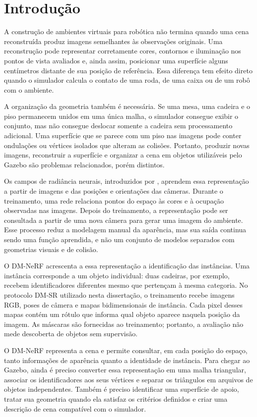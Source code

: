 \chapter{Introdução}

A construção de ambientes virtuais para robótica não termina quando uma cena reconstruída produz imagens semelhantes às observações originais. Uma reconstrução pode representar corretamente cores, contornos e iluminação nos pontos de vista avaliados e, ainda assim, posicionar uma superfície alguns centímetros distante de sua posição de referência. Essa diferença tem efeito direto quando o simulador calcula o contato de uma roda, de uma caixa ou de um robô com o ambiente.

A organização da geometria também é necessária. Se uma mesa, uma cadeira e o piso permanecem unidos em uma única malha, o simulador consegue exibir o conjunto, mas não consegue deslocar somente a cadeira sem processamento adicional. Uma superfície que se parece com um piso nas imagens pode conter ondulações ou vértices isolados que alteram as colisões. Portanto, produzir novas imagens, reconstruir a superfície e organizar a cena em objetos utilizáveis pelo Gazebo são problemas relacionados, porém distintos.

Os campos de radiância neurais, introduzidos por \citet{mildenhall2020nerf}, aprendem essa representação a partir de imagens e das posições e orientações das câmeras. Durante o treinamento, uma rede relaciona pontos do espaço às cores e à ocupação observadas nas imagens. Depois do treinamento, a representação pode ser consultada a partir de uma nova câmera para gerar uma imagem do ambiente. Esse processo reduz a modelagem manual da aparência, mas sua saída continua sendo uma função aprendida, e não um conjunto de modelos separados com geometrias visuais e de colisão.

O DM-NeRF \citep{wang2023dmnerf} acrescenta a essa representação a identificação das instâncias. Uma instância corresponde a um objeto individual: duas cadeiras, por exemplo, recebem identificadores diferentes mesmo que pertençam à mesma categoria. No protocolo DM-SR utilizado nesta dissertação, o treinamento recebe imagens RGB, poses de câmera e mapas bidimensionais de instância. Cada pixel desses mapas contém um rótulo que informa qual objeto aparece naquela posição da imagem. As máscaras são fornecidas ao treinamento; portanto, a avaliação não mede descoberta de objetos sem supervisão.

O DM-NeRF representa a cena e permite consultar, em cada posição do espaço, tanto informações de aparência quanto a identidade de instância. Para chegar ao Gazebo, ainda é preciso converter essa representação em uma malha triangular, associar os identificadores aos seus vértices e separar os triângulos em arquivos de objetos independentes. Também é preciso identificar uma superfície de apoio, tratar sua geometria quando ela satisfaz os critérios definidos e criar uma descrição de cena compatível com o simulador.

